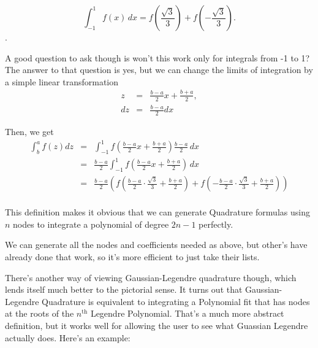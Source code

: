 \documentclass[12pt]{article}
\newcommand{\newLine}{\vspace{5mm}}
\newcommand{\integral}[3]{\text{$\int^{#2}_{#1} #3\,dx$}}
\begin{document}
\begin{equation*} \integral{-1}{1}{f(x)} = f(\frac{\sqrt{3}}{3}) + f(-\frac{\sqrt{3}}{3}). \end{equation*}.

A good question to ask though is won't this work only for integrals from -1 to 1? The answer to that question is yes, but we can change the limits of integration by a simple linear transformation 
\begin{eqnarray*} z &=& \frac{b-a}{2}x + \frac{b+a}{2}, \\
dz &=& \frac{b-a}{2}dx
\end{eqnarray*}

\noindent Then, we get
\begin{eqnarray*}
\int^a_b f(z)dz &=& \integral{-1}{1}{f(\frac{b-a}{2}x + \frac{b+a}{2})\frac{b-a}{2}} \\
&=& \frac{b-a}{2}\integral{-1}{1}{f(\frac{b-a}{2}x + \frac{b+a}{2})} \\
&=& \frac{b-a}{2}\left(f(\frac{b-a}{2}\cdot\frac{\sqrt{3}}{3}+ \frac{b+a}{2}) + f(-\frac{b-a}{2}\cdot\frac{\sqrt{3}}{3}+ \frac{b+a}{2}) \right)\\
\end{eqnarray*}

This definition makes it obvious that we can generate Quadrature formulas using $n$ nodes to integrate a polynomial of degree $2n-1$ perfectly. 

We can generate all the nodes and coefficients needed as above, but other's have already done that work, so it's more efficient to just take their lists.

\newLine There's another way of viewing Gaussian-Legendre quadrature though, which lends itself much better to the pictorial sense. It turns out that Gaussian-Legendre Quadrature is equivalent to integrating a Polynomial fit that has nodes at the roots of the $n^{\text{th}}$ Legendre Polynomial. That's a much more abstract definition, but it works well for allowing the user to see what Guassian Legendre actually does. Here's an example:
\end{document}
